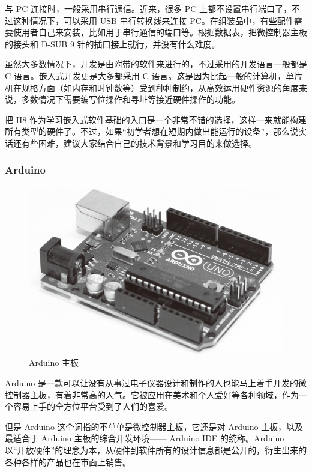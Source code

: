 \documentclass[12pt,UTF8]{ctexbook}
\begin{document}
与 PC 连接时，一般采用串行通信。近来，很多 PC 上都不设置串行端口了，不过这种情况下，可以采用 USB 串行转换线来连接 PC。在组装品中，有些配件需要使用者自己来安装，比如用于串行通信的端口等。根据数据表，把微控制器主板的接头和 D-SUB 9 针的插口接上就行，并没有什么难度。

虽然大多数情况下，开发是由附带的软件来进行的，不过采用的开发语言一般都是 C 语言。嵌入式开发更是大多都采用 C 语言。这是因为比起一般的计算机，单片机在规格方面（如内存和时钟数等）受到种种制约，从高效运用硬件资源的角度来说，多数情况下需要编写位操作和寻址等接近硬件操作的功能。

把 H8 作为学习嵌入式软件基础的入口是一个非常不错的选择，这样一来就能构建所有类型的硬件了。不过，如果“初学者想在短期内做出能运行的设备”，那么说实话还有些困难，建议大家结合自己的技术背景和学习目的来做选择。

\subsubsection{Arduino}

\begin{figure}[htbp]
	\centering
	\includegraphics[width=1\linewidth]{61}
	\caption{Arduino 主板}
	\label{fig:1}
\end{figure}

Arduino 是一款可以让没有从事过电子仪器设计和制作的人也能马上着手开发的微控制器主板，有着非常高的人气。它被应用在美术和个人爱好等各种领域，作为一个容易上手的全方位平台受到了人们的喜爱。

但是 Arduino 这个词指的不单单是微控制器主板，它还是对 Arduino 主板，以及最适合于 Arduino 主板的综合开发环境—— Arduino IDE 的统称。Arduino 以“开放硬件”的理念为本，从硬件到软件所有的设计信息都是公开的，衍生出来的各种各样的产品也在市面上销售。
\end{document}
